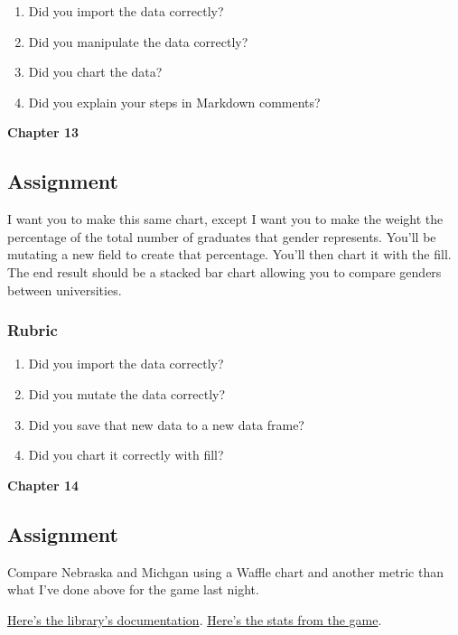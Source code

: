\documentclass[]{book}
\providecommand{\tightlist}{%
  \setlength{\itemsep}{0pt}\setlength{\parskip}{0pt}}
\begin{document}
\begin{enumerate}
\def\labelenumi{\arabic{enumi}.}
\tightlist
\item
  Did you import the data correctly?
\item
  Did you manipulate the data correctly?
\item
  Did you chart the data?
\item
  Did you explain your steps in Markdown comments?
\end{enumerate}

\textbf{Chapter 13}

\subsection{Assignment}\label{assignment-6}

I want you to make this same chart, except I want you to make the weight
the percentage of the total number of graduates that gender represents.
You'll be mutating a new field to create that percentage. You'll then
chart it with the fill. The end result should be a stacked bar chart
allowing you to compare genders between universities.

\subsubsection{Rubric}\label{rubric-4}

\begin{enumerate}
\def\labelenumi{\arabic{enumi}.}
\tightlist
\item
  Did you import the data correctly?
\item
  Did you mutate the data correctly?
\item
  Did you save that new data to a new data frame?
\item
  Did you chart it correctly with fill?
\end{enumerate}

\textbf{Chapter 14}

\subsection{Assignment}\label{assignment-7}

Compare Nebraska and Michgan using a Waffle chart and another metric
than what I've done above for the game last night.

\href{https://github.com/hrbrmstr/waffle}{Here's the library's
documentation}.
\href{https://www.sports-reference.com/cbb/boxscores/2019-02-28-19-michigan.html}{Here's
the stats from the game}.
\end{document}

